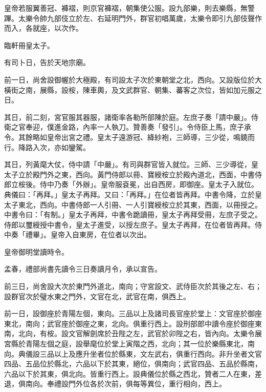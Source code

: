 \begin{pinyinscope}
 皇帝若服翼善冠、褲褶，則京官褲褶，朝集使公服。設九部樂，則去樂縣，無警蹕。太樂令帥九部伎立於左、右延明門外，群官初唱萬歲，太樂令即引九部伎聲作而入，各就座，以次作。



 臨軒冊皇太子。



 有司卜日，告於天地宗廟。



 前一日，尚舍設御幄於大極殿，有司設太子次於東朝堂之北，西向。又設版位於大橫街之南，展縣，設桉，陳車輿，及文武群官、朝集、蕃客之次位，皆如加元服之日。



 其日，前二刻，宮官服其器服，諸衛率各勒所部陳於庭。左庶子奏「請中嚴」。侍衛之官奉迎，僕進金路，內率一人執刀。贊善奏「發引」。令侍臣上馬，庶子承令。其餘略如皇帝出宮之禮。皇太子遠游冠、絳紗袍，三師導，三少從，鳴鐃而行。降路入次，亦如鑾駕。



 其日，列黃麾大仗，侍中請「中嚴」。有司與群官皆入就位。三師、三少導從，皇太子立於殿門外之東，西向。黃門侍郎以冊、寶綬桉立於殿內道北，西面，中書侍郎立桉後。侍中乃奏「外辦」。皇帝服袞冕，出自西房，即御座。皇太子入就位。典儀曰：「再拜。」皇太子再拜。又曰：「再拜。」在位者皆再拜。中書令降，立於皇太子東北，西向。中書侍郎一人引冊、一人引寶綬桉立於其東，西面，以冊授之。中書令曰：「有制。」皇太子再拜，中書令跪讀冊，皇太子再拜受冊，左庶子受之。侍郎以璽綬授中書令，皇太子進受，以授左庶子。皇太子再拜，在位者皆再拜。侍中奏「禮畢」。皇帝入自東房，在位者以次出。



 皇帝御明堂讀時令。



 孟春，禮部尚書先讀令三日奏讀月令，承以宣告。



 前三日，尚舍設大次於東門外道北，南向；守宮設文、武侍臣次於其後之左、右；設群官次於璧水東之門外，文官在北，武官在南，俱西上。



 前一日，設御座於青陽左個，東向。三品以上及諸司長官座於堂上：文官座於御座東北，南向；武官座於御座之東，北向。俱重行西上。設刑部郎中讀令座於御座東南，北向，有桉。設文官解劍席於丑陛之左，武官於卯陛之右，皆內向。太樂令展宮縣於青陽左個之庭，設舉麾位於堂上寅階之西，北向；其一位於樂縣東北，南向。典儀設三品以上及應升坐者位於縣東，文左武右，俱重行西向。非升坐者文官四品、五品位於縣北，六品以下於其東，絕位，俱南向；武官四品、五品於縣南，六品以下於其東，俱北向。皆重行西上。設典儀位於縣之西北，贊者二人在東，差退，俱南向。奉禮設門外位各於次前，俱每等異位，重行相向，西上。




\end{pinyinscope}
